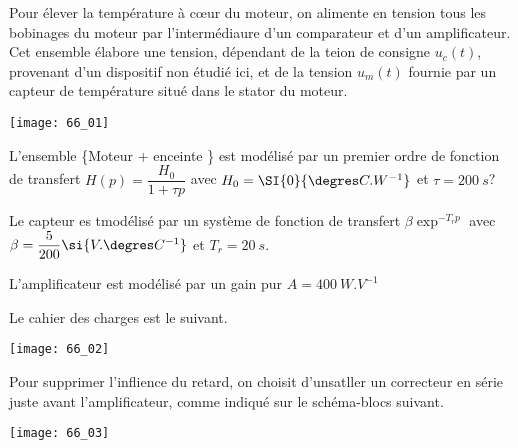 \normaltrue \difficilefalse \tdifficilefalse
\correctionfalse

\setcounter{question}{0}%


\ifcorrection
\else
{}
\fi


\ifprof
\else
Pour élever la température à c\oe{}ur du moteur, on alimente en tension tous les bobinages du moteur par l'intermédiaure d'un comparateur et d'un amplificateur. Cet ensemble élabore une tension, dépendant de la teion de consigne $u_c(t)$, provenant d'un dispositif non étudié ici, et de la tension $u_m(t)$ fournie par un capteur de température situé dans le stator du moteur. 

\begin{marginfigure}
\texttt{[image: 66\_01]}
\end{marginfigure}


L'ensemble \{Moteur + enceinte \} est modélisé par un premier ordre de fonction de transfert $H(p)=\dfrac{H_0}{1+\tau p}$
avec $H_0 = \SI{0}{\degres C.W^{-1}}$ et $\tau=\SI{200}{s}$?

Le capteur es tmodélisé par un système de fonction de transfert $\beta \exp^{-T_r p}$ avec $\beta = \dfrac{5}{200}\si{V.\degres C^{-1}}$ et $T_r = \SI{20}{s}$.

L'amplificateur est modélisé par un gain pur $A= \SI{400}{W.V^{-1}}$

Le cahier des charges est le suivant. 

\begin{marginfigure}
\texttt{[image: 66\_02]}
\end{marginfigure}
\fi

\ifprof
\else 
\fi


\ifprof
\else 
Pour supprimer l'inflience du retard, on choisit d'unsatller un correcteur en série juste avant l'amplificateur, comme indiqué sur le schéma-blocs suivant. 

\begin{marginfigure}
\texttt{[image: 66\_03]}
\end{marginfigure}
\fi

